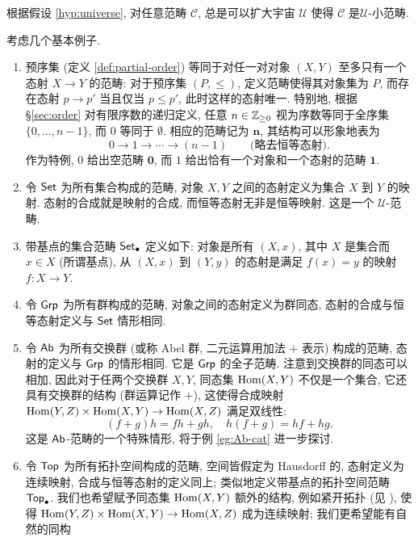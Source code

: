 根据假设 \ref{hyp:universe}, 对任意范畴 $\mathcal{C}$, 总是可以扩大宇宙 $\mathcal{U}$ 使得 $\mathcal{C}$ 是$\mathcal{U}$-小范畴.

\begin{example}\label{eg:categories}
	考虑几个基本例子.
	\begin{enumerate}
		\item 预序集 (定义 \ref{def:partial-order}) 等同于对任一对对象 $(X, Y)$ 至多只有一个态射 $X \to Y$ 的范畴: 对于预序集 $(P, \leq)$, 定义范畴使得其对象集为 $P$, 而存在态射 $p \to p'$ 当且仅当 $p \leq p'$, 此时这样的态射唯一. 特别地, 根据 \S\ref{sec:order} 对有限序数的递归定义, 任意 $n \in \mathbb{Z}_{\geq 0}$ 视为序数等同于全序集 $\{0, \ldots, n-1\}$, 而 $0$ 等同于 $\emptyset$. 相应的范畴记为 $\mathbf{n}$, 其结构可以形象地表为
		\[ 0 \to 1 \to \cdots \to (n-1) \qquad \text{(略去恒等态射)}. \]
		作为特例, $0$ 给出空范畴 $\mathbf{0}$, 而 $1$ 给出恰有一个对象和一个态射的范畴 $\mathbf{1}$. 
		\item 令 $\mathsf{Set}$ 为所有集合构成的范畴, 对象 $X, Y$ 之间的态射定义为集合 $X$ 到 $Y$ 的映射. 态射的合成就是映射的合成, 而恒等态射无非是恒等映射. 这是一个 $\mathcal{U}$-范畴.
		\item 带基点的集合范畴 $\mathsf{Set}_\bullet$ 定义如下: 对象是所有 $(X, x)$, 其中 $X$ 是集合而 $x \in X$ (所谓基点), 从 $(X,x)$ 到 $(Y,y)$ 的态射是满足 $f(x)=y$ 的映射 $f: X \to Y$. 
		\item 令 $\mathsf{Grp}$ 为所有群构成的范畴, 对象之间的态射定义为群同态, 态射的合成与恒等态射定义与 $\mathsf{Set}$ 情形相同.
		\item 令 $\mathsf{Ab}$ 为所有交换群 (或称 Abel 群, 二元运算用加法 $+$ 表示) 构成的范畴, 态射的定义与 $\mathsf{Grp}$ 的情形相同. 它是 $\mathsf{Grp}$ 的全子范畴. 注意到交换群的同态可以相加, 因此对于任两个交换群 $X, Y$, 同态集 $\operatorname{Hom}(X, Y)$ 不仅是一个集合, 它还具有交换群的结构 (群运算记作 $+$), 这使得合成映射 $\operatorname{Hom}(Y, Z) \times \operatorname{Hom}(X, Y) \to \operatorname{Hom}(X, Z)$ 满足双线性:
		\[ (f + g) h = fh + gh, \quad h(f+g) = hf + hg. \]
		这是 $\mathsf{Ab}$-范畴的一个特殊情形, 将于例 \ref{eg:Ab-cat} 进一步探讨.
		\item 令 $\mathsf{Top}$ 为所有拓扑空间构成的范畴, 空间皆假定为 Hausdorff 的, 态射定义为连续映射, 合成与恒等态射的定义同上; 类似地定义带基点的拓扑空间范畴 $\mathsf{Top}_\bullet$. 我们也希望赋予同态集 $\operatorname{Hom}(X,Y)$ 额外的结构, 例如紧开拓扑 (见 \cite[\S 9.3]{Xiong}), 使得 $\operatorname{Hom}(Y, Z) \times \operatorname{Hom}(X, Y) \to \operatorname{Hom}(X, Z)$ 成为连续映射; 我们更希望能有自然的同构 

\end{enumerate}
\end{example}
